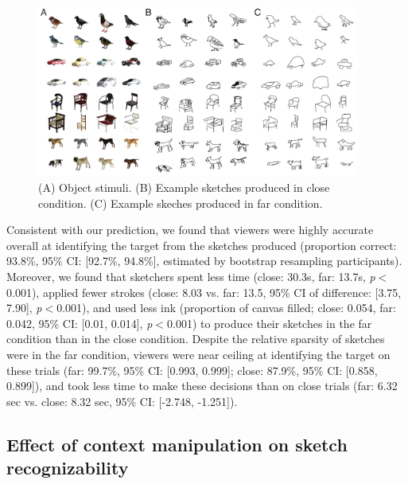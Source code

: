 \documentclass[9pt,twocolumn,twoside]{pnas-new}
\begin{document}

\begin{figure}[htbp]
\centering
\includegraphics[width=0.95\textwidth]{figures/2_sketch_gallery.pdf}
\caption{(A) Object stimuli. (B) Example sketches produced in close condition. (C) Example skeches produced in far condition.}
\label{sketch_gallery}
\end{figure}

Consistent with our prediction, we found that viewers were highly accurate overall at identifying the target from the sketches produced (proportion correct: 93.8\%, 95\% CI: [92.7\%, 94.8\%], estimated by bootstrap resampling participants). 
Moreover, we found that sketchers spent less time (close: 30.3s, far: 13.7s, \textit{p}$<$0.001), applied fewer strokes (close: 8.03 vs. far: 13.5, 95\% CI of difference: [3.75, 7.90], \textit{p}$<$0.001), and used less ink (proportion of canvas filled; close: 0.054, far: 0.042, 95\% CI: [0.01, 0.014], \textit{p}$<$0.001) to produce their sketches in the far condition than in the close condition. 
Despite the relative sparsity of sketches were in the far condition, viewers were near ceiling at identifying the target on these trials (far: 99.7\%, 95\% CI: [0.993, 0.999]; close: 87.9\%, 95\% CI: [0.858, 0.899]), and took less time to make these decisions than on close trials (far: 6.32 sec vs. close: 8.32 sec, 95\% CI: [-2.748, -1.251]).

\subsection*{Effect of context manipulation on sketch recognizability}
\end{document}
